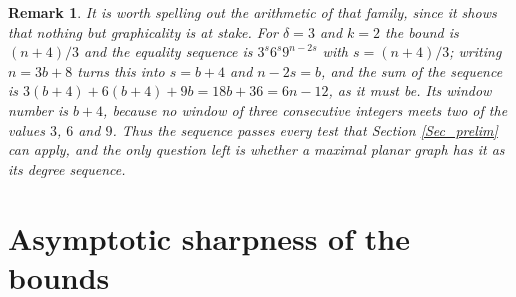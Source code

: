 \documentclass[12pt,a4paper]{article}%
\newtheorem{remark}[theorem]{Remark}
\begin{document}
\begin{remark}
\label{Rem_misses}It is worth spelling out the arithmetic of that family, since
it shows that nothing but graphicality is at stake. For $\delta =3$ and $k=2$
the bound is $(n+4)/3$ and the equality sequence is $3^{s}6^{s}9^{n-2s}$ with
$s=(n+4)/3$; writing $n=3b+8$ turns this into $s=b+4$ and $n-2s=b$, and the sum
of the sequence is $3(b+4)+6(b+4)+9b=18b+36=6n-12$, as it must be. Its window
number is $b+4$, because no window of three consecutive integers meets two of
the values $3$, $6$ and $9$. Thus the sequence passes every test that Section
\ref{Sec_prelim} can apply, and the only question left is whether a
maximal planar graph has it as its degree sequence.
\end{remark}






%



\section{Asymptotic sharpness of the bounds}
\label{Sec_asym}
\end{document}
